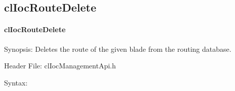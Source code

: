 \begin{flushleft}
\subsection{clIocRouteDelete}
\hypertarget{pageioc204}{}\paragraph{cl\-Ioc\-Route\-Delete}\label{pageioc204}
\begin{Desc}
\item[Synopsis:]Deletes the route of the given blade from the routing database.\end{Desc}
\begin{Desc}
\item[Header File:]clIocManagementApi.h\end{Desc}
\begin{Desc}
\item[Syntax:]


\end{Desc}
\end{flushleft}
